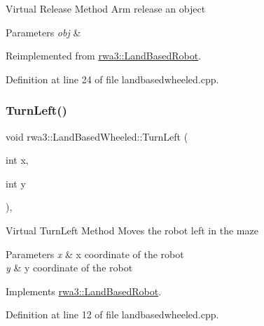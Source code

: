 Virtual Release Method Arm release an object 
\begin{DoxyParams}{Parameters}
{\em obj} & \\
\hline
\end{DoxyParams}


Reimplemented from \hyperlink{classrwa3_1_1_land_based_robot_a5cae9fc0c1365b984e09b807f79089e0}{rwa3\+::\+Land\+Based\+Robot}.



Definition at line 24 of file landbasedwheeled.\+cpp.

\mbox{\label{classrwa3_1_1_land_based_wheeled_a5a659cca86a65e89156ef30ff363de41}} 
\subsubsection{\texorpdfstring{Turn\+Left()}{TurnLeft()}}
{\footnotesize\ttfamily void rwa3\+::\+Land\+Based\+Wheeled\+::\+Turn\+Left (\begin{DoxyParamCaption}\item[{int}]{x,  }\item[{int}]{y }\end{DoxyParamCaption})\hspace{0.3cm}{\ttfamily [override]}, {\ttfamily [virtual]}}

Virtual Turn\+Left Method Moves the robot left in the maze 
\begin{DoxyParams}{Parameters}
{\em x} & x coordinate of the robot \\
\hline
{\em y} & y coordinate of the robot \\
\hline
\end{DoxyParams}


Implements \hyperlink{classrwa3_1_1_land_based_robot_a9adfb103725320c1daff9ab72b0aad08}{rwa3\+::\+Land\+Based\+Robot}.



Definition at line 12 of file landbasedwheeled.\+cpp.

\mbox{\label{classrwa3_1_1_land_based_wheeled_a90d9a8735197a7647f508c1983191590}} 
